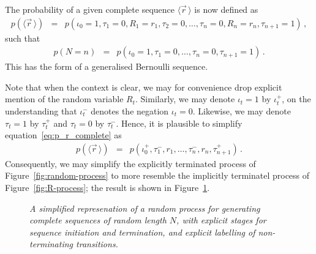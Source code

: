 \documentclass[a4paper]{article}
\newcommand{\vr}{\vec{r}}
\newcommand{\tm}{\tau^{-}}
\begin{document}
The probability of a given complete sequence $\langle\vr\,\rangle$ is now defined as
\begin{eqnarray}
   p(\langle\vr\,\rangle)
& = & p(\iota_0\!=\!1,\tau_1\!=\!0,R_1=r_1,\tau_2\!=\!0,\ldots,\tau_n\!=\!0,R_n=r_n,\tau_{n+1}\!=\!1)
\label{eq:p_r_complete}
\,,
\end{eqnarray}
such that 
\begin{eqnarray}
   p(N\!=\!n) & = &  p(\iota_0\!=\!1,\tau_1\!=\!0,\ldots,\tau_n\!=\!0,\tau_{n+1}\!=\!1)\,.
\end{eqnarray}
This has the form of a generalised Bernoulli sequence.

Note that when the context is clear, we may for convenience drop explicit mention of the random variable $R_t$.
Similarly, we may denote $\iota_t=1$ by $\iota^+_t$, on the understanding that $\iota^-_t$ denotes the negation $\iota_t=0$.
Likewise, we may denote $\tau_t=1$ by $\tau^+_t$ and $\tau_t=0$ by $\tm_t$.
Hence, it is plausible to simplify equation~\eqref{eq:p_r_complete} as
\begin{eqnarray}
p(\langle\vr\,\rangle) 
& = & p(\iota_0^+,\tm_1,r_1,\ldots,\tm_n,r_n,\tau^+_{n+1})\,.
\end{eqnarray}
Consequently, we may simplify the explicitly terminated process of Figure~\ref{fig:random-process} 
to more resemble the implicitly terminatel process of Figure~\ref{fig:R-process}; the result is shown in Figure~\ref{fig:simple-random-process}.
\begin{figure}[hbt]
\centering
{}
\caption{\em A simplified represenation of a random process for generating complete sequences of random length $N$,
with explicit stages for sequence initiation and termination, and explicit labelling of non-terminating transitions.}
\label{fig:simple-random-process}
\end{figure}
\end{document}
